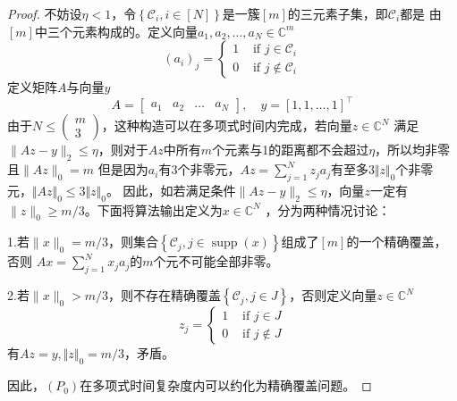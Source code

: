 \begin{proof}
    不妨设$\eta <1$，令$\left\{\mathcal{C}_i,i \in[N]\right\}$是一簇$[m]$的三元素子集，即$\mathcal{C}_i$都是
    由$[m]$中三个元素构成的。定义向量$a_1,a_2,\ldots,a_N \in \mathbb{C}^m$
    \begin{equation}
        \left(a_i\right)_j= \begin{cases}1 & \text { if } j \in \mathcal{C}_i \\ 0 & \text { if } j \notin \mathcal{C}_i\end{cases}
    \end{equation}
    定义矩阵$A$与向量$y$
    \begin{equation}
        A=\left[\begin{array}{l|l|l|l}
        a_1 & a_2 & \ldots & a_N
        \end{array}\right],\quad y=[1,1,\ldots,1]^{\top}
    \end{equation}
由于$N \leq\left(\begin{array}{c}m \\ 3\end{array}\right)$，这种构造可以在多项式时间内完成，若向量$z\in \mathbb{C}^N$
满足$\|A z-y\|_2 \leq \eta$，则对于$Az$中所有$m$个元素与1的距离都不会超过$\eta$，所以均非零且$\|A z\|_0=m$
但是因为$a_i$有3个非零元，$A z=\sum_{j=1}^N z_j a_j$有至多$3\Vert z\Vert_0$个非零元，$\Vert Az\Vert_0\le 3\Vert z\Vert _0$。
因此，如若满足条件$\|A z-y\|_2 \leq \eta$，向量$z$一定有$\|z\|_0 \geq m / 3$。下面将算法输出定义为$x\in \mathbb{C}^N$
，分为两种情况讨论：\par
1.若$\|x\|_0=m / 3$，则集合$\left\{\mathcal{C}_j,j \in \operatorname{supp}(x)\right\}$组成了$[m]$的一个精确覆盖，否则
$A x=\sum_{j=1}^N x_j a_j$的$m$个元不可能全部非零。\par
2.若$\|x\|_0>m / 3$，则不存在精确覆盖$\left\{\mathcal{C}_j,j \in J\right\}$，否则定义向量$z\in \mathbb{C}^N$
\begin{equation*}
    z_j= \begin{cases}1 & \text { if } j \in J \\ 0 & \text { if } j \notin J\end{cases}
\end{equation*}
有$Az=y,\Vert z\Vert_0=m/3$，矛盾。\par
因此，$(P_0)$在多项式时间复杂度内可以约化为精确覆盖问题。
\end{proof}
